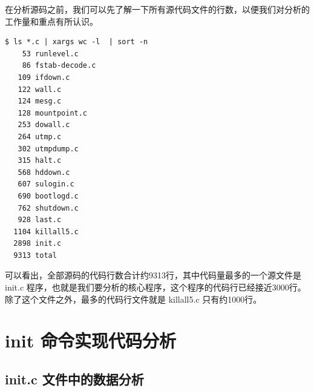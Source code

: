 在分析源码之前，我们可以先了解一下所有源代码文件的行数，以便我们对分析的工作量和重点有所认识。

{\begin{shaded}\begin{verbatim}
$ ls *.c | xargs wc -l  | sort -n
    53 runlevel.c
    86 fstab-decode.c
   109 ifdown.c
   122 wall.c
   124 mesg.c
   128 mountpoint.c
   253 dowall.c
   264 utmp.c
   302 utmpdump.c
   315 halt.c
   568 hddown.c
   607 sulogin.c
   690 bootlogd.c
   762 shutdown.c
   928 last.c
  1104 killall5.c
  2898 init.c
  9313 total
\end{verbatim}\end{shaded}}
可以看出，全部源码的代码行数合计约9313行，其中代码量最多的一个源文件是
init.c
程序，也就是我们要分析的核心程序，这个程序的代码行已经接近3000行。除了这个文件之外，最多的代码行文件就是
killall5.c 只有约1000行。

\section{init 命令实现代码分析}

\subsection{init.c 文件中的数据分析}

